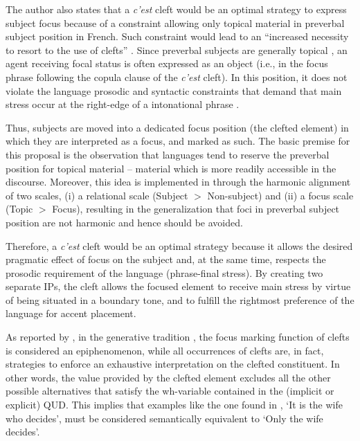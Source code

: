 The author also states that a \textit{c’est} cleft would be an optimal strategy to express subject focus because of a constraint allowing only topical material in preverbal subject position in French. Such constraint would lead to an “increased necessity to resort to the use of clefts” \parencite[490]{lambrecht2001framework}. Since preverbal subjects are generally topical \parencite{chafe1976givenness, keenan1976foregrounding}, an agent receiving focal status is often expressed as an object (i.e., in the focus phrase following the copula clause of the \textit{c’est} cleft). In this position, it does not violate the language prosodic and syntactic constraints that demand that main stress occur at the right-edge of a intonational phrase \parencite{jun2000phonological}. 

Thus, subjects are moved into a dedicated focus position (the clefted element) in which they are interpreted as a focus, and marked as such. The basic premise for this proposal is the observation that languages tend to reserve the preverbal position for topical material – material which is more readily accessible in the discourse. Moreover, this idea is implemented in \textcite{aissen1999markedness} through the harmonic alignment of two scales, (i) a relational scale (Subject $>$ Non-subject) and (ii) a focus scale (Topic $>$ Focus), resulting in the generalization that foci in preverbal subject position are not harmonic and hence should be avoided. 

Therefore, a \textit{c’est} cleft would be an optimal strategy because it allows the desired pragmatic effect of focus on the subject and, at the same time, respects the prosodic requirement of the language (phrase-final stress).
By creating two separate IPs, the cleft allows the  focused  element  to  receive  main  stress by virtue of being situated in a boundary tone, and  to  fulfill  the  rightmost  preference  of the language for accent placement. 

As reported by \textcite{dufter2009clefting}, in the generative tradition \parencite{szabolcsi1981semantics, kiss1998identificational, gussenhoven2008types}, the focus marking function of clefts is considered an epiphenomenon, while all occurrences of clefts are, in fact, strategies to enforce an exhaustive interpretation on the clefted constituent. In other words, the value provided by the  clefted element excludes all the other possible alternatives that satisfy the wh-variable contained in the (implicit or explicit) QUD. This implies that examples like the one found in \textcite[88-89]{jespersen1927modern}, `It is the wife who decides', must be considered semantically equivalent to `Only the wife decides'. 

